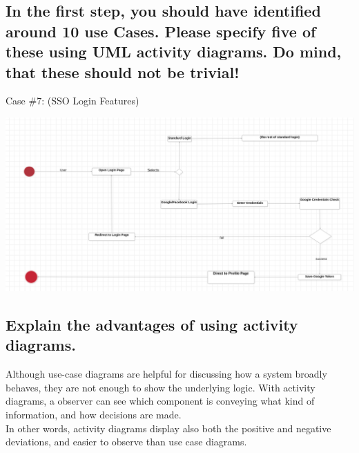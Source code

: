 		\clearpage
			
			
		\subsection{In the first step, you should have identified around 10 use Cases. Please specify
			five of these using UML activity diagrams. Do mind, that these should not be
			trivial!}
		
			\noindent Case \#7:
			(SSO Login Features)
			
			\includegraphics[width=\textwidth]{images/sso.png}
		
			
		
		\subsection{Explain the advantages of using activity diagrams.}
		
		Although use-case diagrams are helpful for discussing how a system broadly behaves, they are not enough to show the underlying logic. With activity diagrams, a observer can see which component is conveying what kind of information, and how decisions are made.\\
		
		In other words, activity diagrams display also both the positive and negative deviations, and easier to observe than use case diagrams.
